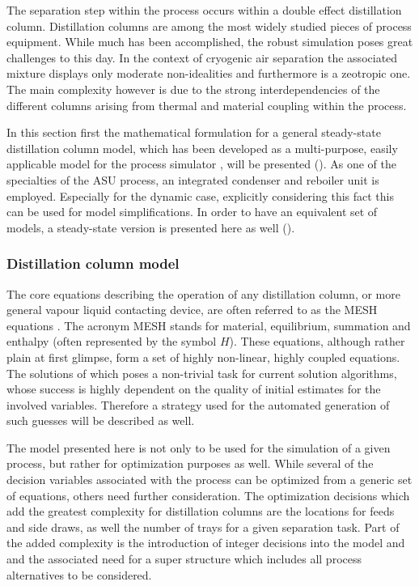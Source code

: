     The separation step within the process occurs within a double effect distillation column.
    Distillation columns are among the most widely studied pieces of process equipment. While much has been
    accomplished, the robust simulation poses great challenges to this day. In the context of cryogenic
    air separation the associated mixture displays only moderate non-idealities and furthermore is
    a zeotropic one. The main complexity however is due to the strong interdependencies of the different
    columns arising from thermal and material coupling within the process.

    In this section first the mathematical formulation for a general steady-state distillation column model,
    which has been developed as a multi-purpose, easily applicable model for the process simulator \gproms,
    will be presented (). As one of the specialties of the ASU process,
    an integrated condenser and reboiler unit is employed. Especially for the dynamic case, explicitly
    considering this fact  this can be used for model simplifications. In order to have an equivalent set of
    models, a steady-state version is presented here as well ().

    \subsubsection{Distillation column model}
    \label{sec:mathpro:steady:distmodel}

        The core equations describing the operation of any distillation column, or more general vapour liquid contacting
        device, are often referred to as the MESH equations \cite{Kister.1992}. The acronym
        MESH stands for material, equilibrium, summation and enthalpy (often represented by the symbol $H$). These equations, although
        rather plain at first glimpse, form a set of highly non-linear, highly coupled equations. The solutions of which
        poses a non-trivial task for current solution algorithms, whose success is highly dependent on the quality of
        initial estimates for the involved variables. Therefore a strategy used for the automated generation of such
        guesses will be described as well.

        The model presented here is not only to be used for the simulation of a given process, but rather
        for optimization purposes as well. While several of the decision variables associated
        with the  process can be optimized from a generic set of equations, others need further consideration.
        The optimization decisions which add the greatest complexity for distillation columns are the locations for feeds
        and side draws, as well the number of trays for a given separation task. Part of the added complexity is
        the introduction of integer decisions into the model and and the associated need for a super structure which
        includes all process alternatives to be considered.

